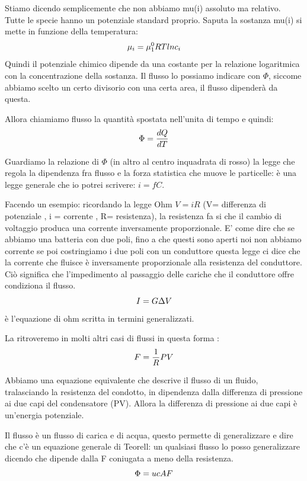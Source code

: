 \documentclass[a4paper,12pt]{article}
\begin{document}
Stiamo dicendo semplicemente che non abbiamo mu(i) assoluto ma relativo.
Tutte le specie hanno un potenziale standard proprio.
Saputa la sostanza mu(i) si mette in funzione della temperatura:
\begin{equation}
\centering
\mu_{i}=\mu_{1}^{0} RT ln c_{i}
\end{equation}
Quindi il potenziale chimico dipende da una costante per la relazione logaritmica con la concentrazione della sostanza.
Il flusso lo possiamo indicare con $\Phi$, siccome abbiamo scelto un certo divisorio con una certa area, il flusso dipenderà da questa.

Allora chiamiamo flusso la quantità spostata nell'unita di tempo e quindi: 
\begin{equation}
\centering
\Phi=\frac{dQ}{dT}
\end{equation}

Guardiamo la relazione di $\Phi$ (in altro al centro inquadrata di rosso) la legge che regola la dipendenza fra flusso e la forza statistica che muove le particelle: è una legge generale che io potrei scrivere: $i = fC$.
  
Facendo un esempio: ricordando la legge Ohm $V=i R$ (V= differenza di potenziale , i = corrente , R= resistenza), la resistenza fa si che il cambio di voltaggio produca una corrente inversamente proporzionale. E' come dire che se abbiamo una batteria con due poli, fino a che questi sono aperti noi non abbiamo corrente se poi costringiamo i due poli con un conduttore questa legge ci dice che la corrente che fluisce è inversamente proporzionale alla resistenza del conduttore.
Ciò significa che l'impedimento al passaggio delle cariche che il conduttore offre condiziona il flusso.
\begin{equation}
\centering
I=G \Delta V
\end{equation}
è l'equazione di ohm scritta in termini generalizzati.

La ritroveremo in molti altri casi di flussi in questa forma :
\begin{equation}
\centering
F=\frac{1}{R} PV 
\end{equation}

Abbiamo una equazione equivalente che descrive il flusso di un fluido, tralasciando la resistenza del condotto, in dipendenza dalla differenza di pressione ai due capi del condensatore (PV).
Allora la differenza di pressione ai due capi è un’energia potenziale.

Il flusso è un flusso di carica e di acqua, questo permette di generalizzare e dire che c'è un equazione generale di Teorell: un qualsiasi flusso lo posso generalizzare dicendo che dipende dalla F coniugata a meno della resistenza.
\begin{equation}
\centering
\Phi= u c A F
\end{equation}
\end{document}

